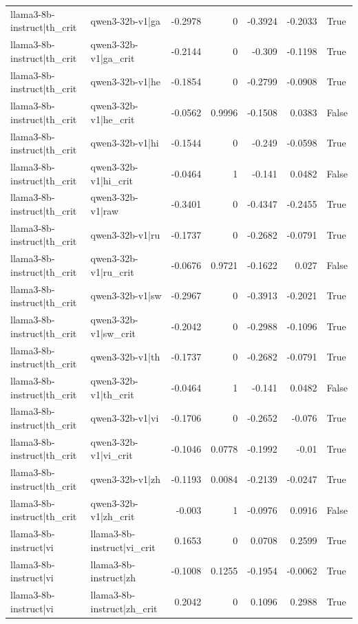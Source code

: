 \begin{table}
\begin{tabular}{l l r r r r l}
llama3-8b-instruct|th_crit & qwen3-32b-v1|ga & -0.2978 & 0 & -0.3924 & -0.2033 & True \\
llama3-8b-instruct|th_crit & qwen3-32b-v1|ga_crit & -0.2144 & 0 & -0.309 & -0.1198 & True \\
llama3-8b-instruct|th_crit & qwen3-32b-v1|he & -0.1854 & 0 & -0.2799 & -0.0908 & True \\
llama3-8b-instruct|th_crit & qwen3-32b-v1|he_crit & -0.0562 & 0.9996 & -0.1508 & 0.0383 & False \\
llama3-8b-instruct|th_crit & qwen3-32b-v1|hi & -0.1544 & 0 & -0.249 & -0.0598 & True \\
llama3-8b-instruct|th_crit & qwen3-32b-v1|hi_crit & -0.0464 & 1 & -0.141 & 0.0482 & False \\
llama3-8b-instruct|th_crit & qwen3-32b-v1|raw & -0.3401 & 0 & -0.4347 & -0.2455 & True \\
llama3-8b-instruct|th_crit & qwen3-32b-v1|ru & -0.1737 & 0 & -0.2682 & -0.0791 & True \\
llama3-8b-instruct|th_crit & qwen3-32b-v1|ru_crit & -0.0676 & 0.9721 & -0.1622 & 0.027 & False \\
llama3-8b-instruct|th_crit & qwen3-32b-v1|sw & -0.2967 & 0 & -0.3913 & -0.2021 & True \\
llama3-8b-instruct|th_crit & qwen3-32b-v1|sw_crit & -0.2042 & 0 & -0.2988 & -0.1096 & True \\
llama3-8b-instruct|th_crit & qwen3-32b-v1|th & -0.1737 & 0 & -0.2682 & -0.0791 & True \\
llama3-8b-instruct|th_crit & qwen3-32b-v1|th_crit & -0.0464 & 1 & -0.141 & 0.0482 & False \\
llama3-8b-instruct|th_crit & qwen3-32b-v1|vi & -0.1706 & 0 & -0.2652 & -0.076 & True \\
llama3-8b-instruct|th_crit & qwen3-32b-v1|vi_crit & -0.1046 & 0.0778 & -0.1992 & -0.01 & True \\
llama3-8b-instruct|th_crit & qwen3-32b-v1|zh & -0.1193 & 0.0084 & -0.2139 & -0.0247 & True \\
llama3-8b-instruct|th_crit & qwen3-32b-v1|zh_crit & -0.003 & 1 & -0.0976 & 0.0916 & False \\
llama3-8b-instruct|vi & llama3-8b-instruct|vi_crit & 0.1653 & 0 & 0.0708 & 0.2599 & True \\
llama3-8b-instruct|vi & llama3-8b-instruct|zh & -0.1008 & 0.1255 & -0.1954 & -0.0062 & True \\
llama3-8b-instruct|vi & llama3-8b-instruct|zh_crit & 0.2042 & 0 & 0.1096 & 0.2988 & True \\

\end{tabular}
\end{table}
